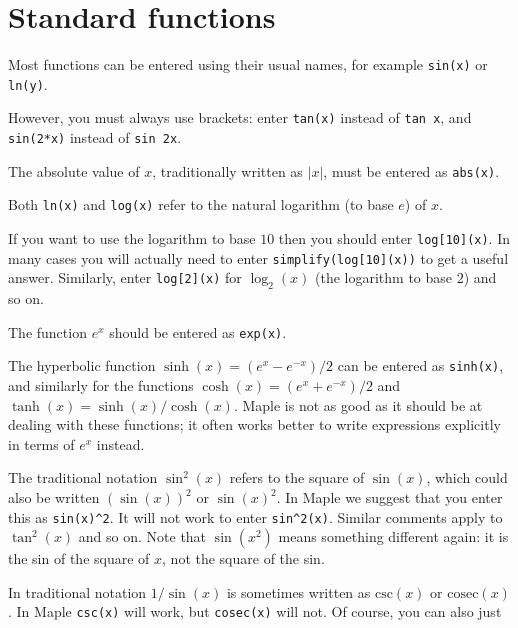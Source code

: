 \documentclass{amsart}
\begin{document}
\section{Standard functions}



\begin{secenum}
%
 \item\label{standard} Most functions can be entered using their
  usual names, for example \verb~sin(x)~ or \verb~ln(y)~. 
%
 \item\label{funcbrackets}
  However, you must always use brackets: enter
  \verb~tan(x)~ instead of \verb~tan x~, and \verb~sin(2*x)~
  instead of \verb~sin 2x~. 
%
 \item\label{abs} The absolute value of $x$, traditionally written as
  $|x|$, must be entered as \verb~abs(x)~. 
%
 \item\label{log} Both \verb~ln(x)~ and \verb~log(x)~
  refer to the natural logarithm (to base $e$) of $x$. 
%
 \item\label{logbase}
  If you want to use the logarithm to base $10$ then you
  should enter \verb~log[10](x)~.  In many cases 
  you will actually need to enter \verb~simplify(log[10](x))~ to get
  a useful answer.  Similarly, enter \verb~log[2](x)~ for
  $\log_2(x)$ (the logarithm to base $2$) and so on. 
%
 \item\label{expx} The function $e^x$ should be entered as \verb~exp(x)~. 
%
 \item\label{hyp} The hyperbolic function $\sinh(x)=(e^x-e^{-x})/2$ can be
  entered as \verb~sinh(x)~, and similarly for the functions
  $\cosh(x)=(e^x+e^{-x})/2$ and $\tanh(x)=\sinh(x)/\cosh(x)$.  Maple
  is not as good as it should be at dealing with these functions; it
  often works better to write expressions explicitly in terms of $e^x$
  instead. 
%
 \item\label{sinsquared} The traditional notation $\sin^2(x)$
  refers to the square of $\sin(x)$, which could also be
  written $(\sin(x))^2$ or $\sin(x)^2$.  In Maple we suggest
  that you enter this as \verb~sin(x)^2~.  It will 
  not work to enter \verb~sin^2(x)~.  Similar comments apply to
  $\tan^2(x)$ and so on.  Note that $\sin(x^2)$ means something
  different again: it is the sin of the square of $x$, not the square
  of the sin. 
%
 \item\label{cosec} In traditional notation $1/\sin(x)$ is sometimes written as
  $\text{csc}(x)$ or $\text{cosec}(x)$.  In Maple \verb~csc(x)~ will
  work, but \verb~cosec(x)~ will not.  Of course, you can also just

\end{secenum}
\end{document}
